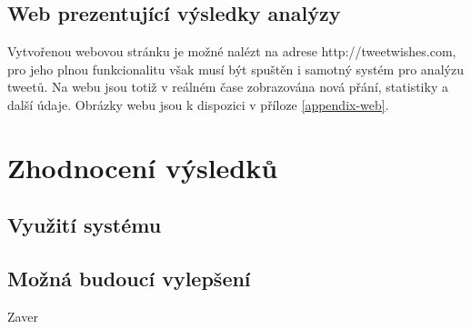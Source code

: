 \documentclass[thesis=B,czech]{FITthesis}[2012/06/26]
\begin{document}
\section{Web prezentující výsledky analýzy}
Vytvořenou webovou stránku je možné nalézt na adrese http://tweetwishes.com, pro jeho plnou funkcionalitu však musí být spuštěn i samotný systém pro analýzu tweetů. Na webu jsou totiž v reálném čase zobrazována nová přání, statistiky a další údaje. Obrázky webu jsou k dispozici v příloze \ref{appendix-web}. 


\chapter{Zhodnocení výsledků}
\label{zhodnoceni}
\section{Využití systému}
\section{Možná budoucí vylepšení}


\begin{conclusion}
	Zaver
\end{conclusion}
\end{document}
